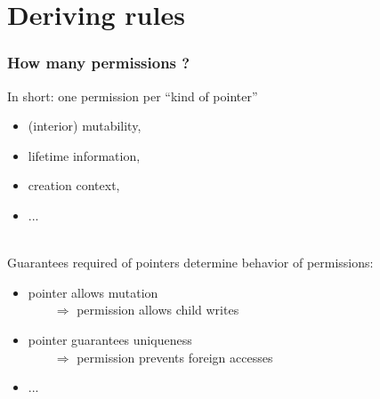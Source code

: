 \section{Deriving rules}

\begin{frame}
    \frametitle{How many permissions ?}
    In short: one permission per ``kind of pointer''
    \begin{itemize}
        \item (interior) mutability,
        \item lifetime information,
        \item creation context,
        \item ...
    \end{itemize}~\\

    Guarantees required of pointers determine behavior of permissions:
    \begin{itemize}
        \item pointer allows mutation \\
            \(\qquad\Rightarrow\) permission allows child writes
        \item pointer guarantees uniqueness\\
            \(\qquad\Rightarrow\) permission prevents foreign accesses
        \item ...
    \end{itemize}
\end{frame}

